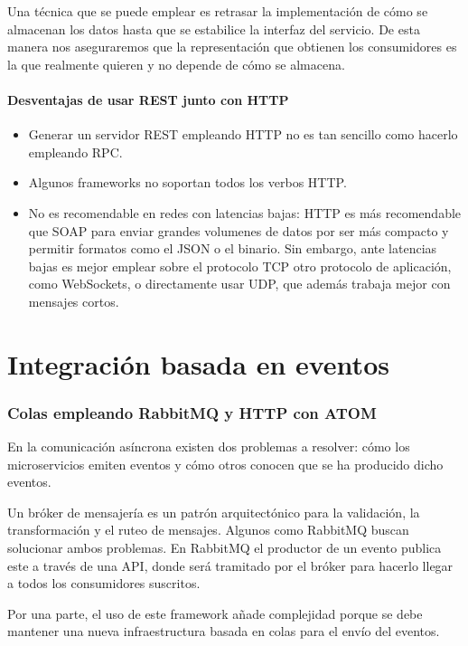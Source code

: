 \documentclass[11pt,a4paper]{article}
\begin{document}
Una técnica que se puede emplear es retrasar la implementación de cómo se almacenan los datos hasta que se estabilice la interfaz del servicio. De esta manera nos aseguraremos que la representación que obtienen los consumidores es la que realmente quieren y no depende de cómo se almacena.

\subsection{Desventajas de usar REST junto con HTTP}
\begin{itemize}
\item Generar un servidor REST empleando HTTP no es tan sencillo como hacerlo empleando RPC.
\item Algunos frameworks no soportan todos los verbos HTTP.
\item No es recomendable en redes con latencias bajas: HTTP es más recomendable que SOAP para enviar grandes volumenes de datos por ser más compacto y permitir formatos como el JSON o el binario. Sin embargo, ante latencias bajas es mejor emplear sobre el protocolo TCP otro protocolo de aplicación, como WebSockets, o directamente usar UDP, que además trabaja mejor con mensajes cortos.

\end{itemize}

\part{Integración basada en eventos}

\section{Colas empleando RabbitMQ y HTTP con ATOM}

En la comunicación asíncrona existen dos problemas a resolver: cómo los microservicios emiten eventos y cómo otros conocen que se ha producido dicho eventos.

Un bróker de mensajería es un patrón arquitectónico para la validación, la transformación y el ruteo de mensajes. Algunos como RabbitMQ buscan solucionar ambos problemas. En RabbitMQ el productor de un evento publica este a través de una API, donde será tramitado por el bróker para hacerlo llegar a todos los consumidores suscritos. 

Por una parte, el uso de este framework añade complejidad porque se debe mantener una nueva infraestructura basada en colas para el envío del eventos. 
\end{document}
